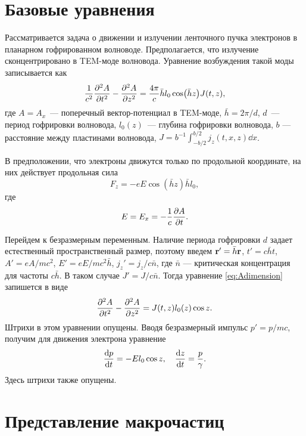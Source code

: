 \documentclass[DIV=11,12pt,a4paper]{scrartcl}
\begin{document}
\tableofcontents

\section{Базовые уравнения}

Рассматривается задача о движении и излучении ленточного пучка электронов в планарном гофрированном волноводе.
Предполагается, что излучение сконцентрировано в TEM-моде волновода.
Уравнение возбуждения такой моды записывается как
\begin{equation}
    \frac{1}{c^2}\pdv[2]{A}{t} - \pdv[2]{A}{z} = \frac{4\pi}{c} \bar{h} l_0 \cos(\bar{h} z) J(t,z),
    \label{eq:Adimension}
\end{equation}
где $A=A_x$~--- поперечный вектор-потенциал в TEM-моде, $\bar{h} = 2\pi/d$, $d$~--- период гофрировки волновода, $l_0(z)$~--- глубина гофрировки волновода, $b$ --- расстояние между пластинами волновода, $J = b^{-1}\int_{-b/2}^{b/2} j_z(t,x,z) \dd{x}$.

В предположении, что электроны движутся только по продольной координате, на них действует продольная сила
\begin{equation}
    F_z = -e E \cos(\bar{h}z) \bar{h} l_0,
\end{equation}
где 
\begin{equation}
    E = E_x = -\frac{1}{c}\pdv{A}{t}.
\end{equation}

Перейдем к безразмерным переменным.
Наличие периода гофрировки $d$ задает естественный пространственный размер, поэтому введем $\vb{r}' = \bar{h} \vb{r}$, $t' = c\bar{h} t$, $A' = eA/mc^2$, $E' = eE/mc^2\bar{h}$, $j_z' = j_z / c \bar{n}$, где $\bar{n}$ --- критическая концентрация для частоты $c\bar{h}$.
В таком случае $J' = J/c \bar{n}$.
Тогда уравнение \eqref{eq:Adimension} запишется в виде
\begin{equation}
    \pdv[2]{A}{t} - \pdv[2]{A}{z} = J(t, z) l_0(z) \cos z.
\end{equation}
Штрихи в этом уравнении опущены.
Вводя безразмерный импульс $p' = p/mc$, получим для движения электрона уравнение
\begin{equation}
    \dv{p}{t} = - E l_0 \cos z, \quad \dv{z}{t} = \frac{p}{\gamma}.
\end{equation}
Здесь штрихи также опущены.

\section{Представление макрочастиц}
\end{document}
